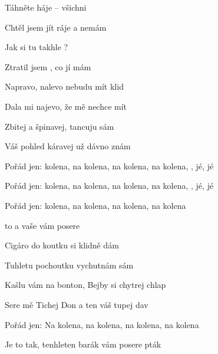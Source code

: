 

\zs
Táhněte  háje -- všichni 

Chtěl jsem jít  ráje a nemám 

Jak si tu  takhle ?

Ztratil jsem , co jí mám 
\ks

\zs
Napravo, {nalevo} nebudu mít {klid}

Dala mi {najevo}, že mě nechce {mít}

Zbitej a {špinavej}, tancuju {sám}

Váš pohled {káravej} už dávno {znám}
\ks

\zr
Pořád jen:  kolena, na kolena, na kolena, na kolena, , jé, jé

Pořád jen:  kolena, na kolena, na kolena, na kolena,  , jé, jé

Pořád jen:  kolena, na kolena, na kolena, na kolena

 to  a vaše  vám posere 
\kr

\zs
Cigáro do koutku si klidně dám

Tuhletu pochoutku vychutnám sám

Kašlu vám na bonton, Bejby si chytrej chlap

Sere mě Tichej Don a ten váš tupej dav
\ks

\zr  \kr

\zr
Pořád jen: Na kolena, na kolena, na kolena, na kolena

Je to tak, tenhleten barák vám posere pták
\kr

\kp





